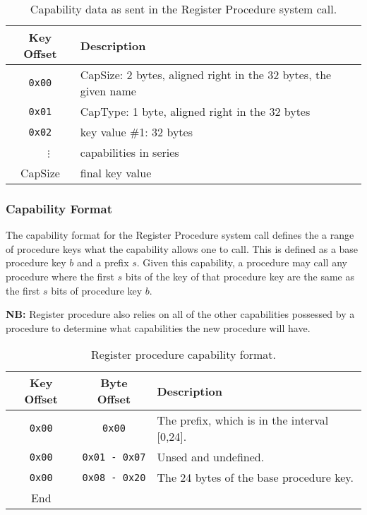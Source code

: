 \documentclass[english,a4paper]{article}
\let\oldparagraph\subsubsection
\renewcommand{\subsubsection}[1]{\oldparagraph{#1}\mbox{}}
\begin{document}
\begin{table}[H]
  \caption{Capability data as sent in the Register Procedure system call.\label{reg-cap-format}}
  \centering{}%
  \begin{tabularx}{\textwidth}{c|X}
    \hline
    Key Offset & Description \\
    \hline
    \hline
    \texttt{0x00}       & CapSize: 2 bytes, aligned right in the 32 bytes, the given
      name \\
    \texttt{0x01}       & CapType: 1 byte, aligned right in the 32 bytes \\
    \texttt{0x02}       & key value \#1: 32 bytes \\
    ~~~$\vdots$ & capabilities in series \\
    CapSize & final key value \\
    \hline
  \end{tabularx}
\end{table}

\subsubsection{Capability Format}
The capability format for the Register Procedure system call defines the a range
of procedure keys what the capability allows one to call. This is defined as a
base procedure key $b$ and a prefix $s$. Given this capability, a procedure may
call any procedure where the first $s$ bits of the key of that procedure key are
the same as the first $s$ bits of procedure key $b$.

\textbf{NB:} Register procedure also relies on all of the other capabilities
possessed by a procedure to determine what capabilities the new procedure will
have.

\begin{table}[H]
  \caption{Register procedure capability format.}
  \centering{}%
  \begin{tabularx}{\textwidth}{c|c|X}
    \hline
    Key Offset & Byte Offset & Description \\
    \hline
    \hline
    \texttt{0x00} & \texttt{0x00} & The prefix, which is in the interval [0,24]. \\
    \texttt{0x00} & \texttt{0x01 - 0x07} & Unsed and undefined. \\
    \texttt{0x00} & \texttt{0x08 - 0x20} & The 24 bytes of the base procedure key. \\
    \hline
    End &   \\
    \hline
  \end{tabularx}
\end{table}
\end{document}
